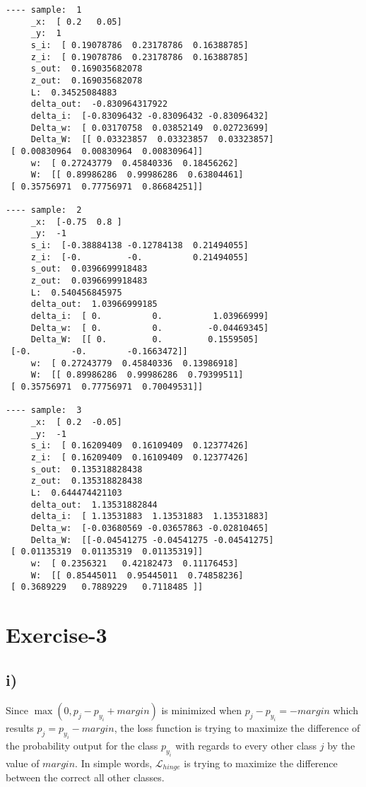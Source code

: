 \documentclass[10pt]{article}
\begin{document}
\begin{multicols}{3}
\begin{tiny}
\begin{verbatim}
---- sample:  1
     _x:  [ 0.2   0.05]
     _y:  1
     s_i:  [ 0.19078786  0.23178786  0.16388785]
     z_i:  [ 0.19078786  0.23178786  0.16388785]
     s_out:  0.169035682078
     z_out:  0.169035682078
     L:  0.34525084883
     delta_out:  -0.830964317922
     delta_i:  [-0.83096432 -0.83096432 -0.83096432]
     Delta_w:  [ 0.03170758  0.03852149  0.02723699]
     Delta_W:  [[ 0.03323857  0.03323857  0.03323857]
 [ 0.00830964  0.00830964  0.00830964]]
     w:  [ 0.27243779  0.45840336  0.18456262]
     W:  [[ 0.89986286  0.99986286  0.63804461]
 [ 0.35756971  0.77756971  0.86684251]]

---- sample:  2
     _x:  [-0.75  0.8 ]
     _y:  -1
     s_i:  [-0.38884138 -0.12784138  0.21494055]
     z_i:  [-0.         -0.          0.21494055]
     s_out:  0.0396699918483
     z_out:  0.0396699918483
     L:  0.540456845975
     delta_out:  1.03966999185
     delta_i:  [ 0.          0.          1.03966999]
     Delta_w:  [ 0.          0.         -0.04469345]
     Delta_W:  [[ 0.         0.         0.1559505]
 [-0.        -0.        -0.1663472]]
     w:  [ 0.27243779  0.45840336  0.13986918]
     W:  [[ 0.89986286  0.99986286  0.79399511]
 [ 0.35756971  0.77756971  0.70049531]]

---- sample:  3
     _x:  [ 0.2  -0.05]
     _y:  -1
     s_i:  [ 0.16209409  0.16109409  0.12377426]
     z_i:  [ 0.16209409  0.16109409  0.12377426]
     s_out:  0.135318828438
     z_out:  0.135318828438
     L:  0.644474421103
     delta_out:  1.13531882844
     delta_i:  [ 1.13531883  1.13531883  1.13531883]
     Delta_w:  [-0.03680569 -0.03657863 -0.02810465]
     Delta_W:  [[-0.04541275 -0.04541275 -0.04541275]
 [ 0.01135319  0.01135319  0.01135319]]
     w:  [ 0.2356321   0.42182473  0.11176453]
     W:  [[ 0.85445011  0.95445011  0.74858236]
 [ 0.3689229   0.7889229   0.7118485 ]]
\end{verbatim}
\end{tiny}
\end{multicols}

\section*{Exercise-3}
\subsection*{i)}
Since $\max(0, p_j - p_{y_i} + margin)$ is minimized when $p_j - p_{y_i} = - margin$ which results $p_j = p_{y_i} - margin$, the loss function is trying to maximize the difference of the probability output for the class $p_{y_i}$ with regards to every other class $j$ by the value of $margin$.
In simple words, $\mathcal{L}_{hinge}$ is trying to maximize the difference between the correct all other classes.
\end{document}
